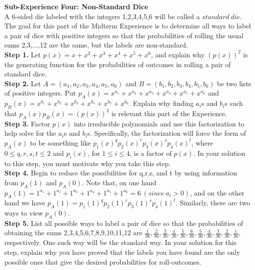 \documentclass[10pt,a4paper]{report}
\begin{document}
	\textbf{Sub-Experience Four: Non-Standard Dice}\\
	A 6-sided die labeled with the integers 1,2,3,4,5,6 will be called a $standard\ die$.  The goal for this part of the Midterm Experience is to determine all ways to label a pair of dice with positive integers so that the probabilities of rolling the usual sums 2,3,...,12 are the same, but the labels are non-standard.\\
	\newline
	\textbf{Step 1.} Let $p(x) = x + x^2 + x^3 + x^4 + x^5 + x^6$, and explain why $(p(x))^2$ is the generating function for the probabilities of outcomes in rolling a pair of standard dice.\\
	\newline
	\textbf{Step 2.} Let $A = (a_1,a_2,a_3,a_4,a_5,a_6)$ and $B = (b_1,b_2,b_3,b_4,b_5,b_6)$ be two lists of positive integers.  Put $p_A(x) = x^{a_1} + x^{a_2} + x^{a_3} + x^{a_4} + x^{a_5} + x^{a_6}$ and $p_B(x) = x^{b_1} + x^{b_2} + x^{b_3} + x^{b_4} + x^{b_5} + x^{b_6}$. Explain why finding $a_i$s and $b_i$s such that $p_A(x)p_B(x) = (p(x))^2$ is relevant this part of the Experience.\\
	\newline
	\textbf{Step 3.} Factor $p(x)$ into irreducible polynomials and use this factorization to help solve for the $a_i$s and $b_i$s.  Specifically, the factorization will force the form of $p_A(x)$ to be something like $p_1(x)^qp_2(x)^rp_3(x)^sp_4(x)^t$, where $0\leq q,r,s,t\leq2$ and $p_i(x)$, for $ 1\leq i\leq4$, is a factor of $p(x)$.  In your solution to this step, you must motivate why you take this step.\\
	\newline
	\textbf{Step 4.} Begin to reduce the possibilities for q,r,s, and t by using information from $p_A(1)$ and $p_A(0)$.  Note that, on one hand $p_A(1) = 1^{a_1} + 1^{a_2} + 1^{a_3} + 1^{a_4} + 1^{a_5} + 1^{a_6} = 6\ (since\ a_i > 0)$, and on the other hand we have $p_A(1) = p_1(1)^qp_2(1)^rp_3(1)^sp_4(1)^t$.  Similarly, there are two ways to view $p_A(0)$.\\
	\newline
	\textbf{Step 5.} List all possible ways to label a pair of dice so that the probabilities of obtaining the sums 2,3,4,5,6,7,8,9,10,11,12 are $\frac{1}{36},\frac{2}{36},\frac{3}{36},\frac{4}{36},\frac{5}{36},\frac{6}{36},\frac{5}{36},\frac{4}{36},\frac{3}{36},\frac{2}{36},\frac{1}{36}$, respectively.  One such way will be the standard way.  In your solution for this step, explain why you have proved that the labels you have found are the only possible ones that give the desired probabilities for roll-outcomes.\\
\end{document}
